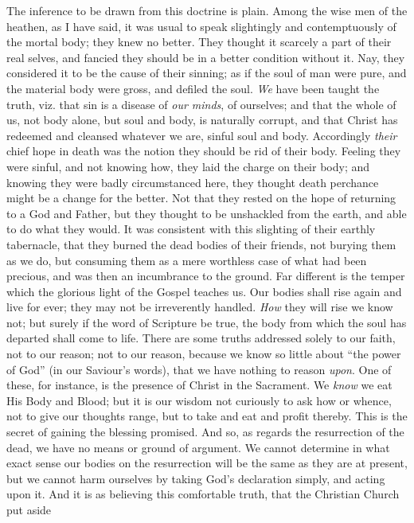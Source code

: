 The inference to be drawn from this doctrine is plain.
Among the wise men of the heathen, as I have said, it was
usual to speak slightingly and contemptuously of the
mortal body; they knew no better. They thought it
scarcely a part of their real selves, and fancied they
should be in a better condition without it. Nay, they
considered it to be the cause of their sinning; as if the soul of man were pure, and the material body were gross,
and defiled the soul. \emph{We} have been taught the
truth, viz. that sin is a disease of \emph{our minds}, of
ourselves; and that the whole of us, not body alone, but
soul and body, is naturally corrupt, and that Christ has
redeemed and cleansed whatever we are, sinful soul and
body. Accordingly \emph{their} chief hope in death was
the notion they should be rid of their body. Feeling they
were sinful, and not knowing how, they laid the charge on
their body; and knowing they were badly circumstanced
here, they thought death perchance might be a change for
the better. Not that they rested on the hope of returning
to a God and Father, but they thought to be unshackled
from the earth, and able to do what they would. It was
consistent with this slighting of their earthly
tabernacle, that they burned the dead bodies of their
friends, not burying them as we do, but consuming them as
a mere worthless case of what had been precious, and was
then an incumbrance to the ground. Far different is the
temper which the glorious light of the Gospel teaches us.
Our bodies shall rise again and live for ever; they may
not be irreverently handled. \emph{How} they will rise we
know not; but surely if the word of Scripture be true,
the body from which the soul has departed shall come to
life. There are some truths addressed solely to our
faith, not to our reason; not to our reason, because we
know so little about ``the power of God'' (in our
Saviour's words), that we have nothing to reason \emph{upon}.
One of these, for instance, is the presence of Christ in
the Sacrament. We \emph{know} we eat His Body and Blood;
but it is our wisdom not curiously to ask how or whence,
not to give our thoughts range, but to take and eat and
profit thereby. This is the secret of gaining the
blessing promised. And so, as regards the resurrection of
the dead, we have no means or ground of argument. We
cannot determine in what exact sense our bodies on the
resurrection will be the same as they are at present, but
we cannot harm ourselves by taking God's declaration
simply, and acting upon it. And it is as believing this
comfortable truth, that the Christian Church put aside

